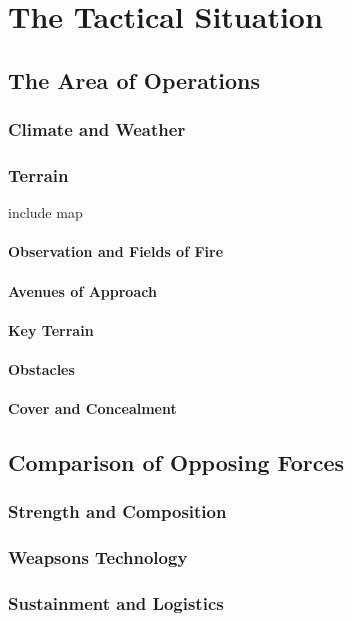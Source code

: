 \section{The Tactical Situation}

\subsection{The Area of Operations}
\subsubsection{Climate and Weather}

\subsubsection{Terrain}

include map

\paragraph{Observation and Fields of Fire}
\paragraph{Avenues of Approach}
\paragraph{Key Terrain}
\paragraph{Obstacles}
\paragraph{Cover and Concealment}

\subsection{Comparison of Opposing Forces}


\subsubsection{Strength and Composition}
\subsubsection{Weapsons Technology}
\subsubsection{Sustainment and Logistics}
